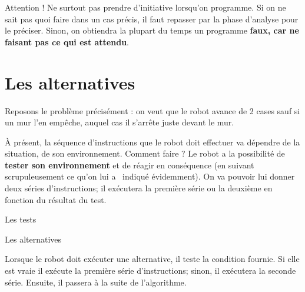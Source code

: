 	Attention ! Ne surtout pas prendre d'initiative
	lorsqu'on programme. Si on ne sait pas quoi faire dans
	un cas précis, il faut repasser par la phase d'analyse
	pour le préciser. Sinon, on obtiendra la plupart du temps un programme
	\textbf{faux, car ne faisant pas ce qui est attendu}.

\section{Les alternatives}

	Reposons le problème précisément : on veut que le robot avance de 2
	cases sauf si un mur l'en empêche, auquel cas il
	s'arrête juste devant le mur.
	
	À présent, la séquence d'instructions que le robot doit
	effectuer va dépendre de la situation, de son environnement. Comment
	faire ? Le robot a la possibilité de \textbf{tester son environnement}
	et de réagir en conséquence (en suivant scrupuleusement ce
	qu'on lui a \ indiqué évidemment). On va pouvoir lui
	donner deux séries d'instructions; il exécutera la
	première série ou la deuxième en fonction du résultat du test.

	
	\begin{Emphase}[definition]{Les tests}
	\end{Emphase}

	
	\begin{Emphase}[definition]{Les alternatives}
	\end{Emphase}

	Lorsque le robot doit exécuter une alternative, il teste la condition
	fournie. Si elle est vraie il exécute la première série
	d'instructions; sinon, il exécutera la seconde série.
	Ensuite, il passera à la suite de l'algorithme.

